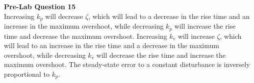 \documentclass[12pt]{article}
\begin{document}
\textbf{Pre-Lab Question 15} \\
Increasing $k_p$ will decrease $\zeta$, which will lead to a decrease in the rise time and an increase in the maximum overshoot, while decreasing $k_p$ will increase the rise time and decrease the maximum overshoot. Increasing $k_v$ will increase $\zeta$, which will lead to an increase in the rise time and a decrease in the maximum overshoot, while decreasing $k_v$ will decrease the rise time and increase the maximum overshoot. The steady-state error to a constant disturbance is inversely proportional to $k_p$. %
\end{document}
